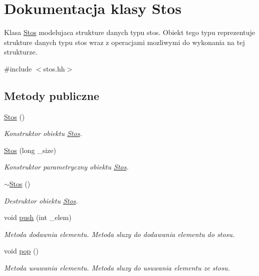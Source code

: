 \hypertarget{class_stos}{\section{Dokumentacja klasy Stos}
\label{class_stos}
}


Klasa \hyperlink{class_stos}{Stos} modelujaca strukture danych typu stos. Obiekt tego typu reprezentuje strukture danych typu stos wraz z operacjami mozliwymi do wykonania na tej strukturze.  




{\ttfamily \#include $<$stos.\-hh$>$}

\subsection*{Metody publiczne}
\begin{DoxyCompactItemize}
\item 
\hyperlink{class_stos_a1de3b50386d5dfb56ddece17d0ea2389}{Stos} ()
\begin{DoxyCompactList}\small\item\em Konstruktor obiektu \hyperlink{class_stos}{Stos}. \end{DoxyCompactList}\item 
\hyperlink{class_stos_a6606affc11eed2b059b8caf287ffca25}{Stos} (long \-\_\-size)
\begin{DoxyCompactList}\small\item\em Konstruktor parametryczny obiektu \hyperlink{class_stos}{Stos}. \end{DoxyCompactList}\item 
\hyperlink{class_stos_af9a198e2540e18adcc0b5259105fd78e}{$\sim$\-Stos} ()
\begin{DoxyCompactList}\small\item\em Destruktor obiektu \hyperlink{class_stos}{Stos}. \end{DoxyCompactList}\item 
void \hyperlink{class_stos_afd5802e405946328cccca3eed676b493}{push} (int \-\_\-elem)
\begin{DoxyCompactList}\small\item\em Metoda dodawnia elementu. Metoda sluzy do dodawania elementu do stosu. \end{DoxyCompactList}\item 
void \hyperlink{class_stos_a88b0da41b49ef4d4b63cfd4924665683}{pop} ()
\begin{DoxyCompactList}\small\item\em Metoda usuwania elementu. Metoda sluzy do usuwania elementu ze stosu. \end{DoxyCompactList}\end{DoxyCompactItemize}
